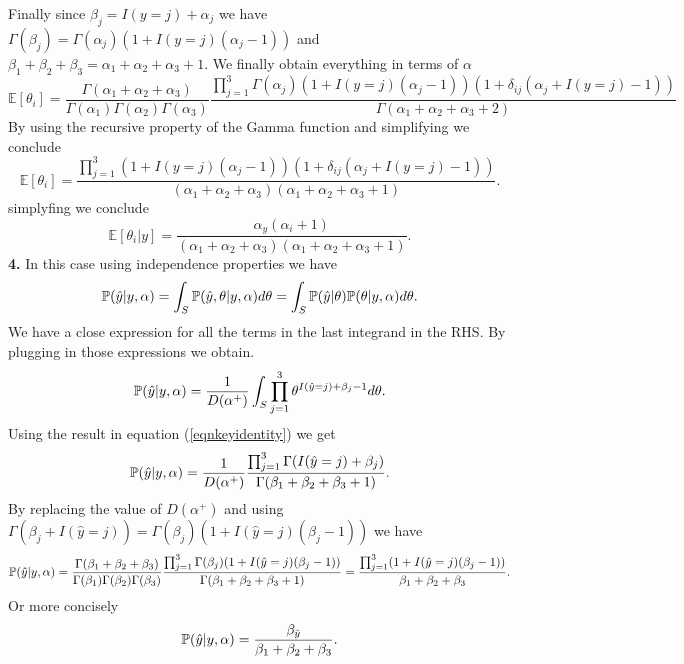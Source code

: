 \documentclass{article}
\begin{document}
Finally since $\beta_j=I(y=j)+\alpha_j$ we have $\Gamma(\beta_j)=\Gamma(\alpha_j)(1+I(y=j)(\alpha_j-1))$ and
$\beta_{1}+\beta_{2}+\beta_{3}=\alpha_1+\alpha_2+\alpha_3+1$. We finally obtain everything in terms of $\alpha$
\begin{equation*}
\mathbb{E}[\theta_{i}]=\frac{\Gamma(\alpha_1+\alpha_2+\alpha_3)}{\Gamma(\alpha_1)\Gamma(\alpha_2)\Gamma(\alpha_3)}
\frac{\prod_{j=1}^{3}\Gamma(\alpha_{j})(1+I(y=j)(\alpha_j-1))(1+\delta_{ij}(\alpha_{j}+I(y=j)-1))}{\Gamma(\alpha_{1}+\alpha_{2}+\alpha_{3}+2)}
\end{equation*}
By using the recursive property of the Gamma function and simplifying we conclude
\begin{equation*}
\mathbb{E}[\theta_{i}]=\frac{\prod_{j=1}^{3}(1+I(y=j)(\alpha_j-1))(1+\delta_{ij}(\alpha_{j}+I(y=j)-1))}{(\alpha_1+\alpha_2+\alpha_3)(\alpha_1+\alpha_2+\alpha_3+1)}.
\end{equation*}
simplyfing we conclude
\begin{equation*}
\mathbb{E}[\theta_{i}|y]=\frac{\alpha_{y}(\alpha_{i}+1)}{(\alpha_1+\alpha_2+\alpha_3)(\alpha_1+\alpha_2+\alpha_3+1)}.
\end{equation*}
\newline
\newline
\textbf{4.}
\newline
In this case using independence properties we have
\begin{equation*}
\mathbb{P}(\hat{y}|y,\alpha)=\int_{S}\mathbb{P}(\hat{y},\theta|y,\alpha)d\theta=\int_{S}\mathbb{P}(\hat{y}|\theta)\mathbb{P}(\theta|y,\alpha)d\theta.
\end{equation*}
We have a close expression for all the terms in the last integrand in the RHS. By plugging in those expressions we obtain.
\begin{equation*}
\mathbb{P}(\hat{y}|y,\alpha)=\frac{1}{D(\alpha^{+})}\int_{S}\prod_{j=1}^{3}\theta^{I(\hat{y}=j)+\beta_{j}-1}d\theta.
\end{equation*}
Using the result in equation (\ref{eqnkeyidentity}) we get
\begin{equation*}
\mathbb{P}(\hat{y}|y,\alpha)=\frac{1}{D(\alpha^{+})}\frac{\prod_{j=1}^{3}\Gamma(I(\hat{y}=j)+\beta_{j})}{\Gamma(\beta_1+\beta_2+\beta_3+1)}.
\end{equation*}
By replacing the value of $D(\alpha^{+})$ and using $\Gamma(\beta_j+I(\hat{y}=j))=\Gamma(\beta_j)(1+I(\hat{y}=j)(\beta_j-1))$ we have
\begin{equation*}
\mathbb{P}(\hat{y}|y,\alpha)=\frac{\Gamma(\beta_1+\beta_2+\beta_3)}{\Gamma(\beta_1)\Gamma(\beta_2)\Gamma(\beta_3)}
\frac{\prod_{j=1}^{3}\Gamma(\beta_j)(1+I(\hat{y}=j)(\beta_j-1))}{\Gamma(\beta_1+\beta_2+\beta_3+1)}=\frac{\prod_{j=1}^{3}(1+I(\hat{y}=j)(\beta_j-1))}{\beta_1+\beta_2+\beta_3}.
\end{equation*}
Or more concisely
\begin{equation*}
\mathbb{P}(\hat{y}|y,\alpha)=\frac{\beta_{\hat{y}}}{\beta_1+\beta_2+\beta_3}.
\end{equation*}
\newpage
\end{document}
